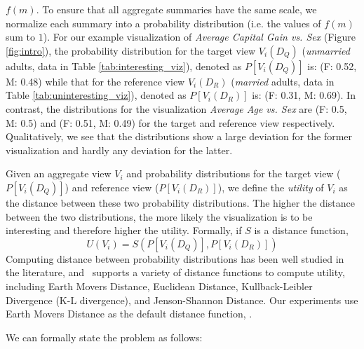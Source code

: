 $f(m)$. 
To ensure that all aggregate summaries have the same scale, we normalize each 
summary into a probability distribution (i.e. the values of $f(m)$ sum to $1$).
For our example visualization of {\em Average Capital Gain vs. Sex} (Figure \ref{fig:intro}),
the probability distribution for the target view $V_i(D_Q)$ ({\em unmarried} adults, data 
in Table \ref{tab:interesting_viz}), 
denoted as $P[V_i (D_Q)]$ is: 
(F: 0.52, M: 0.48) while that for the reference view $V_i(D_R)$ ({\em married} adults, data 
in Table \ref{tab:uninteresting_viz}), 
denoted as $P[V_i (D_R)]$ is:
(F: 0.31, M: 0.69). 
In contrast, the distributions for the visualization {\em Average Age
vs. Sex} are (F: 0.5, M: 0.5) and (F: 0.51, M: 0.49) 
for the target and reference view respectively.
Qualitatively, we see that the distributions show a large deviation for
the former visualization and hardly any deviation for the latter.

Given an aggregate view $V_i$ and probability distributions for the
target view  ($P[V_i (D_Q)]$) and reference view ($P[V_i (D_R)]$), we
define the {\em utility} of $V_i$ as the distance between these two probability
distributions. The higher the distance between the two distributions, the more 
likely the
visualization is to be interesting and therefore higher the utility.
Formally, if $S$ is a distance function,
$$ U (V_i) = S ( P[V_i (D_Q)], P[V_i (D_R)] )$$
Computing distance between probability distributions has
been well studied in the literature, and \SeeDB\ supports a variety of distance
functions
to compute utility, including Earth Movers Distance, 
Euclidean Distance, Kullback-Leibler Divergence (K-L
divergence), and Jenson-Shannon
Distance. 
Our experiments use Earth Movers Distance as the default distance function,
.


We can formally state the \SeeDB problem as follows:

